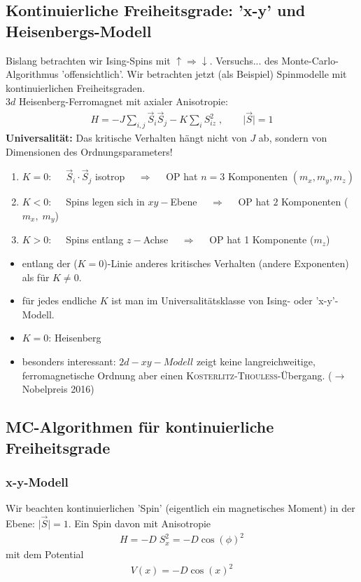 \documentclass[12pt]{article}
\begin{document}
 \subsection{Kontinuierliche Freiheitsgrade: 'x-y' und Heisenbergs-Modell} \label{Kapitel2.9}
 Bislang betrachten wir Ising-Spins mit $ \uparrow \Rightarrow \downarrow$. Versuchs... %
 des Monte-Carlo-Algorithmus 'offensichtlich'. Wir betrachten jetzt (als Beispiel) Spinmodelle mit kontinuierlichen Freiheitsgraden.\\ 
 $3d$ Heisenberg-Ferromagnet mit axialer Anisotropie: 
 \begin{align}
 H= - J \sum_{i,j} \vec{S}_i \vec{S}_j - K \sum_i S_{iz}^2 \; , \quad \quad  \vert \vec{S} \vert
 =1
 \end{align}
 \textbf{Universalität:} Das kritische Verhalten hängt nicht von $J$ ab, sondern von Dimensionen des Ordnungsparameters!
 \begin{enumerate}
 \item $K= 0:  \quad$ $\vec{S}_i \cdot \vec{S}_j$ isotrop $ \quad \Rightarrow  \quad$ OP hat $n=3$ Komponenten $(m_x, m_y, m_z)$
 \item $K<0:  \quad$ Spins legen sich in $xy-$Ebene $ \quad \Rightarrow  \quad$ OP hat $2$ Komponenten ($m_x, \; m_y$)
 \item $K>0 : \quad$ Spins entlang $z-$Achse $ \quad \Rightarrow  \quad$ OP hat 1 Komponente ($m_z$)
 \end{enumerate}
 \begin{itemize}
 \item entlang der ($K=0$)-Linie anderes kritisches Verhalten (andere Exponenten) als für $K\neq 0$.
 \item für jedes endliche $K$ ist man im Universalitätsklasse von Ising- oder 'x-y'-Modell. 
 \item $K=0$: Heisenberg
 
 \item besonders interessant: $2d-xy-Modell$ zeigt keine langreichweitige, ferromagnetische Ordnung aber einen \textsc{Kosterlitz-Thouless}-Übergang. ($\to$ Nobelpreis 2016) 
\end{itemize}
\subsection{MC-Algorithmen für kontinuierliche Freiheitsgrade}
\subsubsection{x-y-Modell}
Wir beachten kontinuierlichen 'Spin' (eigentlich ein magnetisches Moment) in der Ebene: $\vert \vec{S} \vert = 1$. Ein Spin davon mit Anisotropie \begin{align*}
H=-D \; S_x^2 = -D \cos(\phi)^2
\end{align*} mit dem Potential
\begin{align*}
V(x) = -D \cos(x)^2
\end{align*}
\end{document}
